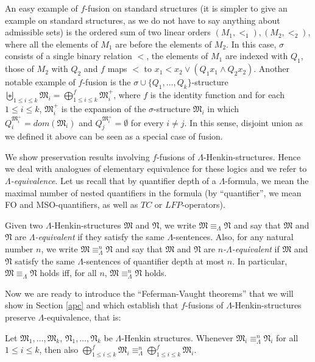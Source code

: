 \documentclass{LMCS}
\newcommand{\frM}{\mathfrak{M}}
\newcommand{\frN}{\mathfrak{N}}
\newcommand{\fo}{\textsf{FO}\xspace}
\newcommand{\mso}{\textsf{MSO}\xspace}
\begin{document}
An easy example of $f$-fusion on standard structures (it
is simpler to give an example on standard structures, as we do not have to say anything about admissible sets) is
the ordered sum of two linear orders $(M_1,<_1),(M_2,<_2)$, where
all the elements of $M_1$ are before the elements of $M_2$. In
this case, $\sigma$ consists of a single binary relation $<$, the
elements of $M_1$ are indexed with $Q_1$, those of $M_2$ with
$Q_2$ and $f$ maps $<$ to $x_1< x_2 \vee (Q_1x_1 \wedge Q_2 x_2)$. Another notable example of $f$-fusion is the  $\sigma \cup \{Q_1, \ldots, Q_k\}$-structure
$\biguplus_{1 \leq i \leq k} \frM_i=\bigoplus_{1 \leq i \leq k}^f \frM_i^+$, where $f$ is the identity function and for each $1\leq i \leq k$,
$\frM_i^+$ is the expansion of the $\sigma$-structure $\frM_i$ in which $Q_i^{\frM_i^+}=dom(\frM_i)$ and  $Q_j^{\frM_i^+}=\emptyset$ for every $i \neq j$. In this sense, disjoint
union as we defined it above can be seen as a special case of fusion.

We show preservation results involving $f$-fusions of
$\Lambda$-Henkin-structures. Hence we deal with analogues of
elementary equivalence for these logics and we refer to
\emph{$\Lambda$-equivalence}. Let us recall that by quantifier depth of a $\Lambda$-formula, we mean the maximal number of nested quantifiers in the formula (by ``quantifier'', we mean \fo and \mso-quantifiers, as well as $TC$ or $LFP$-operators).

\begin{defi}
Given two $\Lambda$-Henkin-structures $\frM$ and $\frN$, we write
$\frM\equiv_\Lambda\frN$ and say that $\frM$ and $\frN$ are
\emph{$\Lambda$-equivalent} if they satisfy the same $\Lambda$-sentences. Also, for any natural number $n$, we write
$\frM\equiv_\Lambda^n\frN$ and say that $\frM$ and $\frN$ are \emph{$n$-$\Lambda$-equivalent} if $\frM$ and $\frN$ satisfy the same
$\Lambda$-sentences of quantifier depth at most $n$. In
particular, $\frM\equiv_\Lambda\frN$ holds iff, for all $n$,
$\frM\equiv_\Lambda^n\frN$ holds.
\end{defi}

Now we are ready to introduce the ``Feferman-Vaught theorems'' that we will show in Section \ref{apc} and which establish that $f$-fusions of $\Lambda$-Henkin-structures preserve
$\Lambda$-equivalence, that is:

\begin{thm}
Let $\frM_1,\ldots,\frM_k$, $\frN_1,\ldots,\frN_k$ be $\Lambda$-Henkin structures. Whenever $\frM_i \equiv^n_\Lambda \frN_i$ for all $1 \leq i \leq k$,
then also $\bigoplus_{1 \leq i \leq k}^f \frM_i \equiv^n_\Lambda \bigoplus_{1 \leq i \leq k}^f \frM_i$.
\end{thm}
\end{document}

